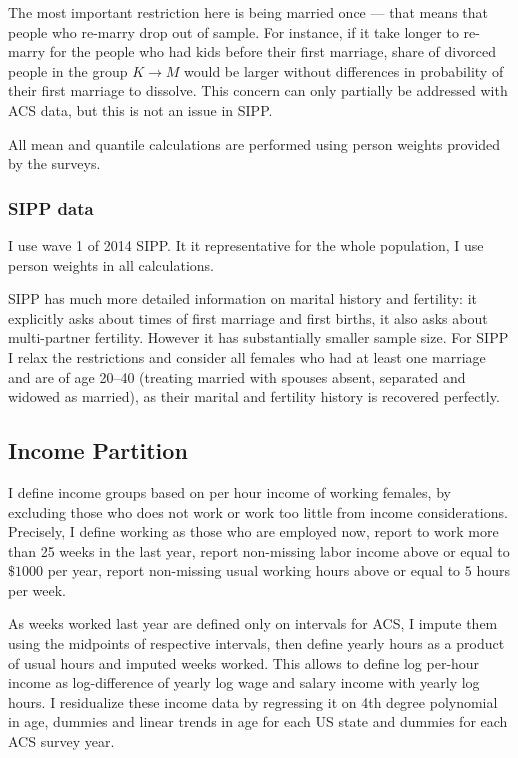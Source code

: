 \documentclass[12pt,letter]{article}
\begin{document}
The most important restriction here is being married once --- that means that people who re-marry drop out of sample. For instance, if it take longer to re-marry for the people who had kids before their first marriage, share of divorced people in the group $K\to M$ would be larger without differences in probability of their first marriage to dissolve. This concern can only partially be addressed with ACS data, but this is not an issue in SIPP. 

All mean and quantile calculations are performed using person weights provided by the surveys.

\subsubsection{SIPP data}

I use wave 1 of 2014 SIPP. It it representative for the whole population, I use person weights in all calculations.

SIPP has much more detailed information on marital history and fertility: it explicitly asks about times of first marriage and first births, it also asks about multi-partner fertility. However it has substantially smaller sample size. For SIPP I relax the restrictions and consider all females who had at least one marriage and are of age 20--40 (treating married with spouses absent, separated and widowed as married), as their marital and fertility history is recovered perfectly.


\subsection{Income Partition\label{inc-part}}
I define income groups based on per hour income of working females, by excluding those who does not work or work too little from income considerations. Precisely, I define working as those who are employed now, report to work more than 25 weeks in the last year, report non-missing labor income above or equal to $\$1000$ per year, report non-missing usual working hours above or equal to $5$ hours per week.

As weeks worked last year are defined only on intervals for ACS, I impute them using the midpoints of respective intervals, then define yearly hours as a product of usual hours and imputed weeks worked. This allows to define log per-hour income as log-difference of yearly log wage and salary income with yearly log hours. I residualize these income data by regressing it on 4th degree polynomial in age, dummies and linear trends in age for each US state and dummies for each ACS survey year.
\end{document}
